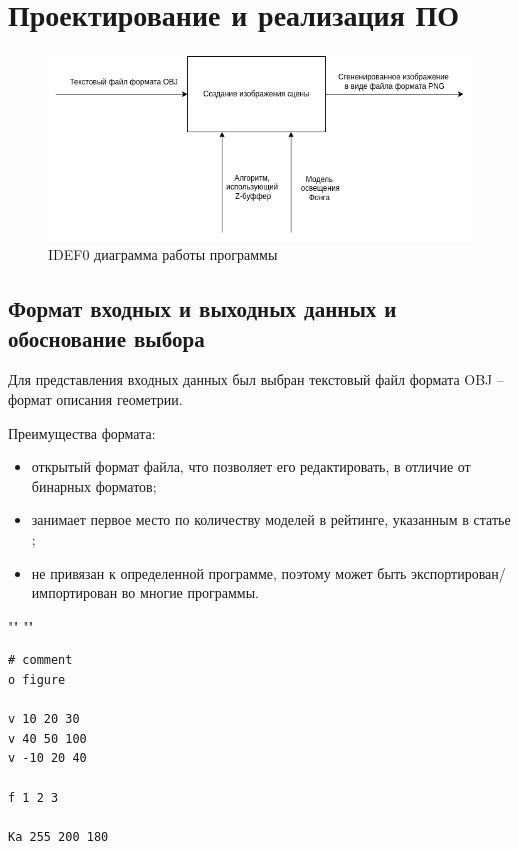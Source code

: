 \chapter{Проектирование и реализация ПО}

\begin{figure}[H]
	\begin{center}
		\includegraphics[width=\linewidth]{images/idf0}
	\end{center}
	\captionsetup{justification=centering}
	\caption{IDEF0 диаграмма работы программы}
	\label{img:s1}
\end{figure}

\section{Формат входных и выходных данных и обоснование выбора}
Для представления входных данных был выбран текстовый файл формата OBJ -- формат описания геометрии.

Преимущества формата:
\begin{itemize}
	\item открытый формат файла, что позволяет его редактировать, в отличие от бинарных форматов;
	\item занимает первое место по количеству моделей в рейтинге, указанным в статье \cite{bib8};
	\item не привязан к определенной программе, поэтому может быть экспортирован/импортирован во многие программы. 
\end{itemize}
""\newline
""\newline
\begin{lstlisting}[caption={Пример .obj файла}]
# comment
o figure

v 10 20 30 
v 40 50 100
v -10 20 40

f 1 2 3

Ka 255 200 180	
\end{lstlisting}


